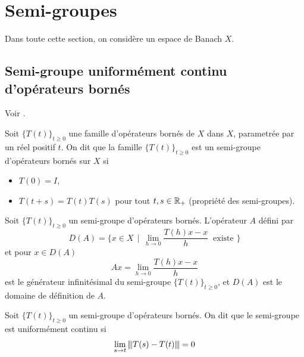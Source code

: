 
\section{Semi-groupes}\label{annexe_SG}
Dans toute cette section, on considère un espace de Banach $X$.

\subsection{Semi-groupe uniformément continu d'opérateurs bornés}
Voir \cite[p.~1]{Pazy1983}.
\begin{definition}
    Soit $\big\{T(t)\big\}_{t \geq 0}$ une famille d'opérateurs bornés de $X$ dans $X$, parametrée par un réel positif $t$. On dit que la famille $\big\{T(t)\big\}_{t \geq 0}$ est un \textcolor{astral}{semi-groupe d'opérateurs bornés sur $X$} si 
    \begin{itemize}
        \item[$(i)$] $T(0)=I$,
        \item[$(ii)$] $T(t+s)=T(t)T(s)$ pour tout $t,s \in \mathbb{R}_+$ (propriété des semi-groupes). 
    \end{itemize}
\end{definition}

\begin{definition}
    Soit $\big\{T(t)\big\}_{t \geq 0}$ un semi-groupe d'opérateurs bornés. L'opérateur $A$ défini par 
    \begin{equation*}
        D(A) = \Big\{ x \in X \ \ | \ \ \lim_{h \to 0} \frac{T(h)x-x}{h} \ \text{ existe } \Big\}
    \end{equation*}
    et pour $x \in D(A)$
    \begin{equation*}
        Ax = \lim_{h \to 0} \frac{T(h)x-x}{h}
    \end{equation*}
    est le \textcolor{astral}{générateur infinitésimal du semi-groupe $\big\{T(t)\big\}_{t \geq 0}$}, et $D(A)$ est le domaine de définition de $A$.
\end{definition}

\begin{definition}
    Soit $\big\{T(t)\big\}_{t \geq 0}$ un semi-groupe d'opérateurs bornés. On dit que le semi-groupe est \textcolor{astral}{uniformément continu} si 
    \begin{equation*}
        \lim_{s \to t} {\left\vert\kern-0.25ex\left\vert \kern-0.25ex\left\vert T(s)-T(t) \right\vert\kern-0.25ex\right\vert\kern-0.25ex\right\vert}=0
    \end{equation*}
\end{definition}

